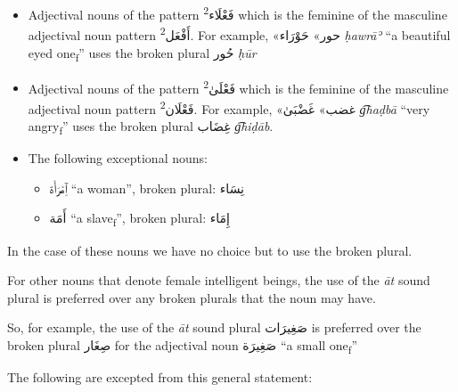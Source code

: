 \documentclass[
  10pt,
]{book}
\providecommand{\tightlist}{%
  \setlength{\itemsep}{0pt}\setlength{\parskip}{0pt}}
\begin{document}
\begin{itemize}
\item
  Adjectival nouns of the pattern \textsuperscript{2}\foreignlanguage{arabic}{فَعْلَاء} which is the feminine of the masculine adjectival noun pattern \textsuperscript{2}\foreignlanguage{arabic}{أَفْعَل}. For example, \foreignlanguage{arabic}{«حور»} \foreignlanguage{arabic}{حَوْرَاء} \emph{ḥawrāʾ} \enquote{a beautiful eyed one\textsubscript{f}} uses the broken plural \foreignlanguage{arabic}{حُور} \emph{ḥūr}
\item
  Adjectival nouns of the pattern \textsuperscript{2}\foreignlanguage{arabic}{فَعْلَىٰ} which is the feminine of the masculine adjectival noun pattern \textsuperscript{2}\foreignlanguage{arabic}{فَعْلَان}. For example, \foreignlanguage{arabic}{«غضب»} \foreignlanguage{arabic}{غَضْبَىٰ} \emph{g͡haḍbā} \enquote{very angry\textsubscript{f}} uses the broken plural \foreignlanguage{arabic}{غِضَاب} \emph{g͡hiḍāb}.
\item
  The following exceptional nouns:

  \begin{itemize}
  \tightlist
  \item
    \foreignlanguage{arabic}{ٱِمْرَأَة} \enquote{a woman}, broken plural: \foreignlanguage{arabic}{نِسَاء}
  \item
    \foreignlanguage{arabic}{أَمَة} \enquote{a slave\textsubscript{f}}, broken plural: \foreignlanguage{arabic}{إِمَاء}
  \end{itemize}
\end{itemize}

In the case of these nouns we have no choice but to use the broken plural.

For other nouns that denote female intelligent beings, the use of the \emph{āt} sound plural is preferred over any broken plurals that the noun may have.

So, for example,
the use of the \emph{āt} sound plural
\foreignlanguage{arabic}{صَغِيرَات}
is preferred over the broken plural
\foreignlanguage{arabic}{صِغَار}
for the adjectival noun
\foreignlanguage{arabic}{صَغِيرَة}
\enquote{a small one\textsubscript{f}}

The following are excepted from this general statement:
\end{document}
